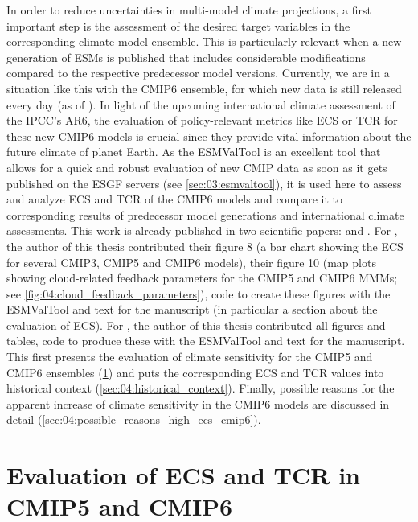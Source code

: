 In order to reduce uncertainties in multi-model climate projections, a first
important step is the assessment of the desired target variables in the
corresponding climate model ensemble. This is particularly relevant when a new
generation of \acp{ESM} is published that includes considerable modifications
compared to the respective predecessor model versions. Currently, we are in a
situation like this with the \acs{CMIP}6 ensemble, for which new data is still
released every day (as of \TheMonth{}). In light of the upcoming international
climate assessment of the \ac{IPCC}'s \acs{AR}6, the evaluation of
policy-relevant metrics like \ac{ECS} or \ac{TCR} for these new \acs{CMIP}6
models is crucial since they provide vital information about the future climate
of planet Earth. As the \ac{ESMValTool} is an excellent tool that allows for a
quick and robust evaluation of new \ac{CMIP} data as soon as it gets published
on the \ac{ESGF} servers (see \cref{sec:03:esmvaltool}), it is used here to
assess and analyze \ac{ECS} and \ac{TCR} of the \acs{CMIP}6 models and compare
it to corresponding results of predecessor model generations and international
climate assessments. This work is already published in two scientific papers:
\textcite{Bock2020} and \textcite{Meehl2020}. For \textcite{Bock2020}, the
author of this thesis contributed their figure 8 (a bar chart showing the
\ac{ECS} for several \acs{CMIP}3, \acs{CMIP}5 and \acs{CMIP}6 models), their
figure 10 (map plots showing cloud-related feedback parameters for the
\acs{CMIP}5 and \acs{CMIP}6 \acp{MMM}; see
\cref{fig:04:cloud_feedback_parameters}), code to create these figures with the
\ac{ESMValTool} and text for the manuscript (in particular a section about the
evaluation of \ac{ECS}). For \textcite{Meehl2020}, the author of this thesis
contributed all figures and tables, code to produce these with the
\ac{ESMValTool} and text for the manuscript. This
 first presents the evaluation of
climate sensitivity for the \acs{CMIP}5 and \acs{CMIP}6 ensembles
(\cref{sec:04:evaluation_ecs_and_tcr}) and puts the corresponding \ac{ECS} and
\ac{TCR} values into historical context (\cref{sec:04:historical_context}).
Finally, possible reasons for the apparent increase of climate sensitivity in
the \acs{CMIP}6 models are discussed in detail
(\cref{sec:04:possible_reasons_high_ecs_cmip6}).


\section{Evaluation of \acs{ECS} and \acs{TCR} in \acs{CMIP}5 and \acs{CMIP}6}
\label{sec:04:evaluation_ecs_and_tcr}

